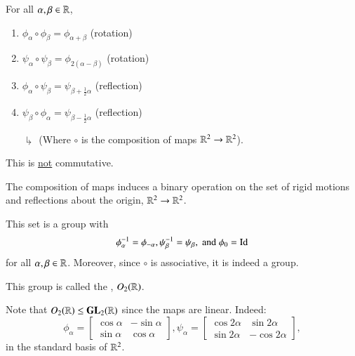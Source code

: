 \documentclass[12pt, a4paper, oneside, openright, titlepage]{book}
\begin{document}
\begin{claim}
    For all $\alpha,\beta \in \mathbb R$, \begin{enumerate}
        \item $\phi_{\alpha} \circ \phi_{\beta} = \phi_{\alpha + \beta}$ (rotation) 
        \item $\psi_{\alpha} \circ \psi_{\beta} = \phi_{2(\alpha - \beta)}$ (rotation) 
        \item $\phi_{\alpha} \circ \psi_{\beta} = \psi_{\beta + \frac{1}{2}\alpha}$ (reflection) 
        \item $\psi_{\beta} \circ \phi_{\alpha} = \psi_{\beta - \frac{1}{2}\alpha}$ (reflection) 
    \end{enumerate}
    \begin{enumerate}
        \item[$\drsh$] (Where $\circ$ is the composition of maps $\mathbb R^2\rightarrow \mathbb R^2$). 
    \end{enumerate}
\end{claim}

\begin{note}
    This is \underline{not} commutative.
\end{note}


\begin{cor}
    The composition of maps induces a binary operation on the set of rigid motions and reflections about the origin, $\mathbb R^2\rightarrow \mathbb R^2$.
\end{cor}

\begin{prop}
    This set is a group with \begin{equation}
        \phi_{\alpha}^{-1} = \phi_{-\alpha}, \psi^{-1}_{\beta} = \psi_{\beta}, \;\text{and}\;\phi_0 = \operatorname{Id}
    \end{equation}
    for all $\alpha,\beta \in \mathbb R$. Moreover, since $\circ$ is associative, it is indeed a group.
\end{prop}

\begin{defn}
    This group is called the , $O_2(\mathbb R)$.
\end{defn}

\begin{prop}
    Note that $O_2(\mathbb R) \leq \mathbf{GL}_2(\mathbb R)$ since the maps are linear. Indeed: \begin{equation}
        \phi_{\alpha} = \begin{bmatrix} \cos\alpha & -\sin\alpha \\ \sin\alpha & \cos\alpha \end{bmatrix}, \psi_{\alpha} = \begin{bmatrix} \cos2\alpha & \sin2\alpha \\ \sin2\alpha & -\cos2\alpha \end{bmatrix}, 
    \end{equation}
    in the standard basis of $\mathbb R^2$.
\end{prop}
\end{document}
